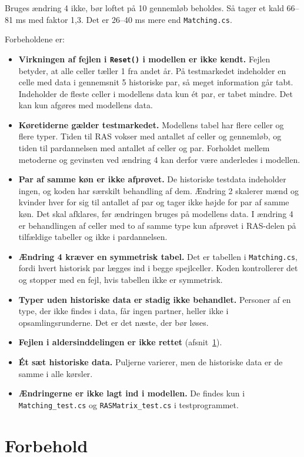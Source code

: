 \documentclass[11pt,a4paper]{article}
\newcommand{\kode}[1]{\texttt{#1}}
\begin{document}
Bruges ændring 4 ikke, bør loftet på 10 gennemløb beholdes. Så tager et kald 66--81 ms med faktor
1,3. Det er 26--40 ms mere end \kode{Matching.cs}.

Forbeholdene er:

\begin{itemize}
\item \textbf{Virkningen af fejlen i \kode{Reset()} i modellen er ikke kendt.} Fejlen betyder, at
alle celler tæller 1 fra andet år. På testmarkedet indeholder en celle med data i gennemsnit 5
historiske par, så meget information går tabt. Indeholder de fleste celler i modellens data kun ét
par, er tabet mindre. Det kan kun afgøres med modellens data.
\item \textbf{Køretiderne gælder testmarkedet.} Modellens tabel har flere celler og flere typer.
Tiden til RAS vokser med antallet af celler og gennemløb, og tiden til pardannelsen med antallet af
celler og par. Forholdet mellem metoderne og gevinsten ved ændring 4 kan derfor være anderledes i
modellen.
\item \textbf{Par af samme køn er ikke afprøvet.} De historiske testdata indeholder ingen, og koden
har særskilt behandling af dem. Ændring 2 skalerer mænd og kvinder hver for sig til antallet af par
og tager ikke højde for par af samme køn. Det skal afklares, før ændringen bruges på modellens
data. I ændring 4 er behandlingen af celler med to af samme type kun afprøvet i RAS-delen på
tilfældige tabeller og ikke i pardannelsen.
\item \textbf{Ændring 4 kræver en symmetrisk tabel.} Det er tabellen i \kode{Matching.cs}, fordi
hvert historisk par lægges ind i begge spejlceller. Koden kontrollerer det og stopper med en fejl,
hvis tabellen ikke er symmetrisk.
\item \textbf{Typer uden historiske data er stadig ikke behandlet.} Personer af en type, der ikke
findes i data, får ingen partner, heller ikke i opsamlingsrunderne. Det er det næste, der bør
løses.
\item \textbf{Fejlen i aldersinddelingen er ikke rettet} (afsnit~\ref{sec:forbehold}).
\item \textbf{Ét sæt historiske data.} Puljerne varierer, men de historiske data er de samme i alle
kørsler.
\item \textbf{Ændringerne er ikke lagt ind i modellen.} De findes kun i \kode{Matching\_test.cs} og
\kode{RASMatrix\_test.cs} i testprogrammet.
\end{itemize}


\section{Forbehold}\label{sec:forbehold}
\end{document}
